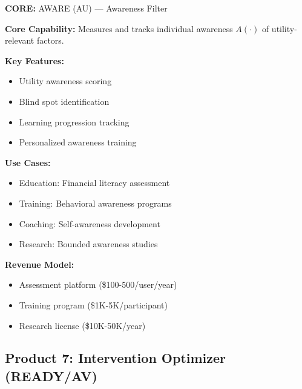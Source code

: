 \begin{tcolorbox}[colback=purple!5!white, colframe=purple!75!black,
    title=Product: Awareness Assessment]

\textbf{CORE:} AWARE (AU) --- Awareness Filter

\textbf{Core Capability:}
Measures and tracks individual awareness $A(\cdot)$ of utility-relevant factors.

\textbf{Key Features:}
\begin{itemize}[nosep]
\item Utility awareness scoring
\item Blind spot identification
\item Learning progression tracking
\item Personalized awareness training
\end{itemize}

\textbf{Use Cases:}
\begin{itemize}[nosep]
\item Education: Financial literacy assessment
\item Training: Behavioral awareness programs
\item Coaching: Self-awareness development
\item Research: Bounded awareness studies
\end{itemize}

\textbf{Revenue Model:}
\begin{itemize}[nosep]
\item Assessment platform (\$100-500/user/year)
\item Training program (\$1K-5K/participant)
\item Research license (\$10K-50K/year)
\end{itemize}

\end{tcolorbox}


\subsection{Product 7: Intervention Optimizer (READY/AV)}


